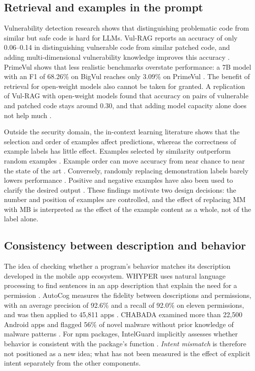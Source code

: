 \documentclass[a4paper,fleqn]{cas-dc}
\begin{document}
\subsection{Retrieval and examples in the prompt}
Vulnerability detection research shows that distinguishing problematic code from
similar but safe code is hard for LLMs. Vul-RAG reports an accuracy of only
0.06--0.14 in distinguishing vulnerable code from similar patched code, and
adding multi-dimensional vulnerability knowledge improves this accuracy
\citep{du2026vulrag}. PrimeVul shows that less realistic benchmarks overstate
performance: a 7B model with an F1 of 68.26\% on BigVul reaches only 3.09\% on
PrimeVul \citep{ding2025vulnerability}. The benefit of retrieval for
open-weight models also cannot be taken for granted. A replication of
Vul-RAG with open-weight models found that accuracy on pairs of vulnerable
and patched code stays around 0.30, and that adding model capacity alone does
not help much \citep{kaniewski2026revisiting}.

Outside the security domain, the in-context learning literature shows that
the selection and order of examples affect predictions, whereas the correctness
of example labels has little effect. Examples selected by similarity outperform
random examples \citep{liu2022makes}. Example order can move accuracy from near
chance to near the state of the art \citep{zhao2021calibrate}. Conversely,
randomly replacing demonstration labels barely lowers performance
\citep{min2022rethinking}. Positive and negative examples have also been used to
clarify the desired output \citep{gao2024customizing}. These findings motivate
two design decisions: the number and position of examples are controlled, and
the effect of replacing MM with MB is interpreted as the effect of the example
content as a whole, not of the label alone.

\subsection{Consistency between description and behavior}
The idea of checking whether a program's behavior matches its description
developed in the mobile app ecosystem. WHYPER uses natural language processing to
find sentences in an app description that explain the need for a permission
\citep{pandita2013whyper}. AutoCog measures the fidelity between descriptions and
permissions, with an average precision of 92.6\% and a recall of 92.0\% on
eleven permissions, and was then applied to 45,811 apps \citep{qu2014autocog}.
CHABADA examined more than 22,500 Android apps and flagged 56\% of novel malware
without prior knowledge of malware patterns \citep{gorla2014checking}. For npm
packages, IntelGuard implicitly assesses whether behavior is consistent with the
package's function \citep{guo2026bridging}. \emph{Intent mismatch} is therefore
not positioned as a new idea; what has not been measured is the effect of
explicit intent separately from the other components.
\end{document}
